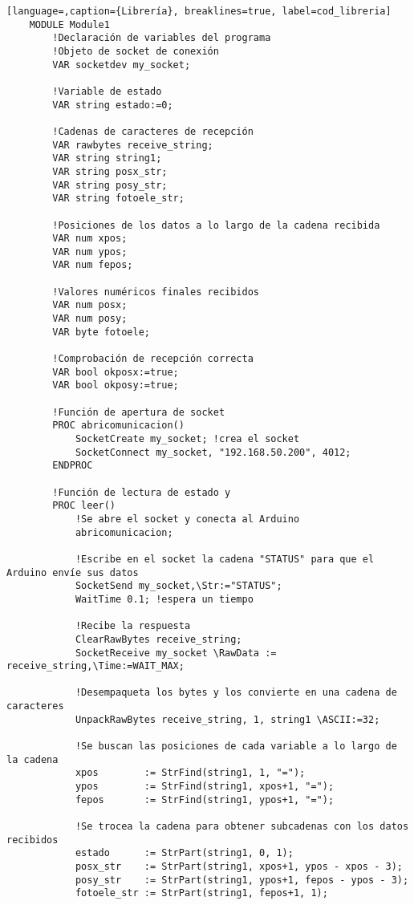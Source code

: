 \begin{lstlisting}[language=,caption={Librería}, breaklines=true, label=cod_libreria]
    MODULE Module1  
        !Declaración de variables del programa
        !Objeto de socket de conexión
        VAR socketdev my_socket;
    
        !Variable de estado
        VAR string estado:=0;
    
        !Cadenas de caracteres de recepción
        VAR rawbytes receive_string;
        VAR string string1;
        VAR string posx_str;
        VAR string posy_str;
        VAR string fotoele_str;
    
        !Posiciones de los datos a lo largo de la cadena recibida
        VAR num xpos;
        VAR num ypos;
        VAR num fepos;
        
        !Valores numéricos finales recibidos
        VAR num posx;
        VAR num posy;
        VAR byte fotoele;
        
        !Comprobación de recepción correcta
        VAR bool okposx:=true;
        VAR bool okposy:=true;
            
        !Función de apertura de socket
        PROC abricomunicacion()        
            SocketCreate my_socket; !crea el socket
            SocketConnect my_socket, "192.168.50.200", 4012;        
        ENDPROC
        
        !Función de lectura de estado y 
        PROC leer()
            !Se abre el socket y conecta al Arduino
            abricomunicacion;
            
            !Escribe en el socket la cadena "STATUS" para que el Arduino envíe sus datos
            SocketSend my_socket,\Str:="STATUS"; 
            WaitTime 0.1; !espera un tiempo
    
            !Recibe la respuesta 
            ClearRawBytes receive_string;
            SocketReceive my_socket \RawData := receive_string,\Time:=WAIT_MAX;
            
            !Desempaqueta los bytes y los convierte en una cadena de caracteres
            UnpackRawBytes receive_string, 1, string1 \ASCII:=32;
            
            !Se buscan las posiciones de cada variable a lo largo de la cadena
            xpos        := StrFind(string1, 1, "=");
            ypos        := StrFind(string1, xpos+1, "=");
            fepos       := StrFind(string1, ypos+1, "=");
            
            !Se trocea la cadena para obtener subcadenas con los datos recibidos
            estado      := StrPart(string1, 0, 1);
            posx_str    := StrPart(string1, xpos+1, ypos - xpos - 3);
            posy_str    := StrPart(string1, ypos+1, fepos - ypos - 3);
            fotoele_str := StrPart(string1, fepos+1, 1);
    

\end{lstlisting}
